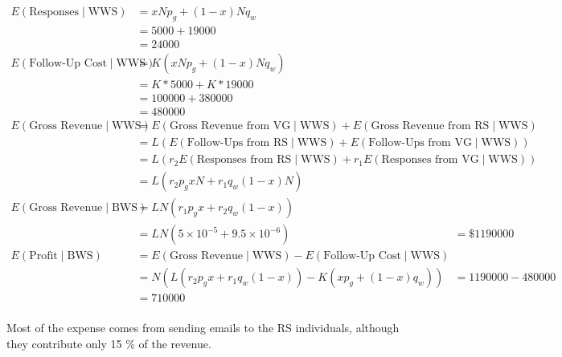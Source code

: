 \documentclass{article}
\begin{document}
\begin{align}
E\left( \text{Responses} \mid \text{WWS} \right) 
	& = x N p_g + (1 - x) N q_w \nonumber \\
	& = 5000 + 19000 \nonumber \\
	& = 24000 \nonumber \\
E\left( \text{Follow-Up Cost} \mid \text{WWS} \right)
	& = K \left( x N p_g + (1 - x) N q_w \right) \nonumber \\
	& = K * 5000 + K * 19000 \nonumber \\
	& = 100000 + 380000\nonumber\\
	& = 480000 \nonumber \\
E\left( \text{Gross Revenue} \mid \text{WWS} \right)
	& = E\left( \text{Gross Revenue from VG} \mid \text{WWS} \right)
	+ E\left( \text{Gross Revenue from RS} \mid \text{WWS} \right) \nonumber \\
	& = L \left( 
		E\left( \text{Follow-Ups from RS} \mid \text{WWS} \right)
		+ E\left( \text{Follow-Ups from VG} \mid \text{WWS} \right) \right) \nonumber \\
	& = L \left( 
		r_2 E\left( \text{Responses from RS} \mid \text{WWS} \right)
		+ r_1 E\left( \text{Responses from VG} \mid \text{WWS} \right) \right) \nonumber \\
	& = L \left( 
		r_2 p_g x N
		+ r_1 q_w (1-x) N  \right) \nonumber \\
E\left( \text{Gross Revenue} \mid \text{BWS} \right)
	& = L N \left( r_1 p_g x + r_2 q_w (1-x) \right) \\
	& = L N \left( 5 \times 10^{-5} + 9.5 \times 10^{-6} \right)
	& = \$ 1190000 \nonumber \\
E\left( \text{Profit} \mid \text{BWS} \right)
	& = E\left( \text{Gross Revenue} \mid \text{WWS} \right)
	- E\left( \text{Follow-Up Cost} \mid \text{WWS} \right) \nonumber \\
	& = N \left( L \left( 
		r_2 p_g x
		+ r_1 q_w (1-x)  \right) 
	- K \left(x p_g + (1 - x) q_w \right) \right) \nonumber
	& = 1190000 - 480000 \nonumber \\
	& = 710000 \nonumber \\
\end{align}

Most of the expense comes from sending emails to the RS individuals,
	although they contribute only 15 \% of the revenue.
\end{document}

